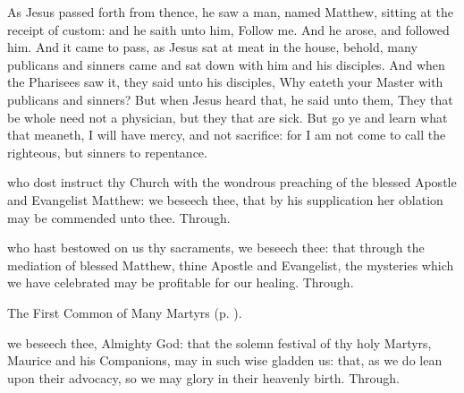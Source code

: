 
 As Jesus passed forth from thence, he saw a man, named Matthew, sitting at the receipt of custom: and he saith unto him, Follow me. And he arose, and followed him. And it came to pass, as Jesus sat at meat in the house, behold, many publicans and sinners came and sat down with him and his disciples. And when the Pharisees saw it, they said unto his disciples, Why eateth your Master with publicans and sinners? But when Jesus heard that, he said unto them, They that be whole need not a physician, but they that are sick. But go ye and learn what that meaneth, I will have mercy, and not sacrifice: for I am not come to call the righteous, but sinners to repentance.


\secret
{} who dost instruct thy Church with the wondrous preaching of the blessed Apostle and Evangelist Matthew: we beseech thee, that by his supplication her oblation may be commended unto thee. Through.


\postcommunion
{} who hast bestowed on us thy sacraments, we beseech thee: that through the mediation of blessed Matthew, thine Apostle and Evangelist, the mysteries which we have celebrated may be profitable for our healing. Through.


\clearpage
{}

\begin{rubric}
	The First Common of Many Martyrs (p. \pageref{CommonMartyrsI}).
\end{rubric}

\collect
{} we beseech thee, Almighty God: that the solemn festival of thy holy Martyrs, Maurice and his Companions, may in such wise gladden us: that, as we do lean upon their advocacy, so we may glory in their heavenly birth. Through.

